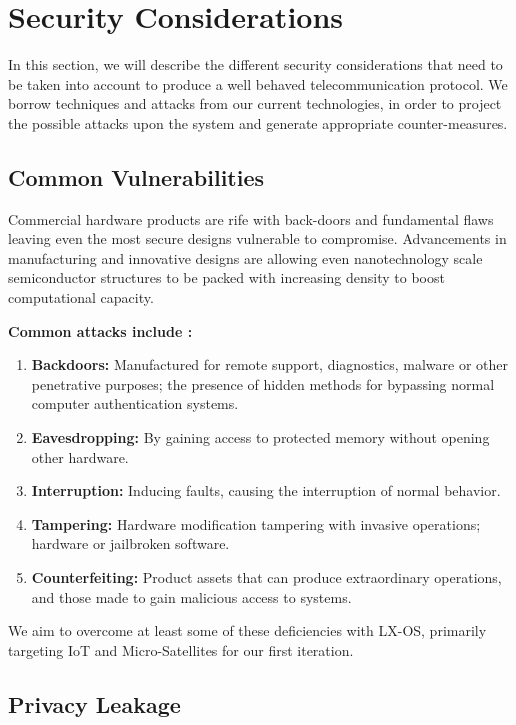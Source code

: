 \documentclass[11pt]{article}
\begin{document}
\section{Security Considerations}

In this section, we will describe the different security considerations that need to be taken into account to produce a well behaved telecommunication protocol.
We borrow techniques and attacks from our current technologies, in order to project the possible attacks upon the system and generate appropriate counter-measures.


\subsection{Common Vulnerabilities}

Commercial hardware products are rife with back-doors and fundamental flaws leaving even the most secure designs vulnerable to compromise.
Advancements in manufacturing and innovative designs are allowing even nanotechnology scale semiconductor structures to be packed with increasing density to boost computational capacity. 

\bigskip
{\large\noindent\textbf{Common attacks include \cite{HW-attacks}:}}

\begin{enumerate}
\item \textbf{Backdoors:} Manufactured for remote support, diagnostics, malware or other penetrative purposes; the presence of hidden methods for bypassing normal computer authentication systems.
\item \textbf{Eavesdropping:} By gaining access to protected memory without opening other hardware.
\item \textbf{Interruption:} Inducing faults, causing the interruption of normal behavior.
\item \textbf{Tampering:} Hardware modification tampering with invasive operations; hardware or jailbroken software.
\item \textbf{Counterfeiting:} Product assets that can produce extraordinary operations, and those made to gain malicious access to systems.
\end{enumerate}

\noindent We aim to overcome at least some of these deficiencies with LX-OS, primarily targeting IoT and Micro-Satellites for our first iteration.

\subsection{Privacy Leakage}
\label{privacy-leakage}
\end{document}
